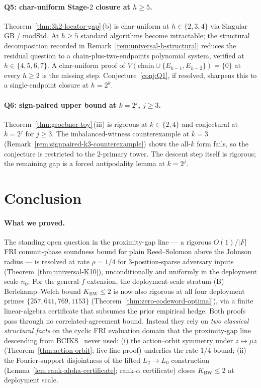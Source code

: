 \documentclass[11pt]{article}
\theoremstyle{definition}
\theoremstyle{remark}
\begin{document}
\paragraph{Q5: char-uniform Stage-$2$ closure at $h \geq 5$.}
Theorem~\ref{thm:3k2-locator-gap}\,(b) is char-uniform at
$h \in \{2, 3, 4\}$ via Singular GB / modStd. At $h \geq 5$ standard
algorithms become intractable; the structural decomposition recorded
in Remark~\ref{rem:universal-h-structural} reduces the residual
question to a chain-plus-two-endpoints polynomial system, verified at
$h \in \{4, 5, 6, 7\}$. A char-uniform proof of $V(\text{chain} \cup
\{E_{h-1}, E_{h-2}\}) = \{0\}$ at every $h \geq 2$ is the missing
step. Conjecture~\ref{conj:Q1}, if resolved, sharpens this to a
single-endpoint closure at $h = 2^k$.

\paragraph{Q6: sign-paired upper bound at $k = 2^j$, $j \geq 3$.}
Theorem~\ref{thm:groebner-toy}\,(iii) is rigorous at
$k \in \{2, 4\}$ and conjectural at $k = 2^j$ for $j \geq 3$. The
imbalanced-witness counterexample at $k = 3$
(Remark~\ref{rem:signpaired-k3-counterexample}) shows the all-$k$
form fails, so the conjecture is restricted to the $2$-primary tower.
The descent step itself is rigorous; the remaining gap is a forced
antipodality lemma at $k = 2^j$.

\section{Conclusion}
\label{sec:conclusion}

\paragraph{What we proved.}
The standing open question in the proximity-gap line --- a rigorous
$O(1)/|F|$ FRI commit-phase soundness bound for plain Reed--Solomon
above the Johnson radius --- is resolved at rate $\rho = 1/4$ for
$3$-position-sparse adversary inputs (Theorem~\ref{thm:universal-K10}),
unconditionally and uniformly in the deployment scale $n_0$. For the
general-$f$ extension, the deployment-scale stratum-(B) Berlekamp--Welch
bound $K_{\mathrm{BW}} \leq 2$ is now also rigorous at all four
deployment primes $\{257, 641, 769, 1153\}$
(Theorem~\ref{thm:zero-codeword-optimal}), via a finite linear-algebra
certificate that subsumes the prior empirical hedge. Both proofs pass
through no correlated-agreement bound. Instead they rely on \emph{two
classical structural facts} on the cyclic FRI evaluation domain that
the proximity-gap line descending from BCIKS~\cite{BCIKS} never used:
(i) the action--orbit symmetry under $z \mapsto \mu z$
(Theorem~\ref{thm:action-orbit}; five-line proof) underlies the rate-$1/4$
bound; (ii) the Fourier-support disjointness of the lifted
$L_2 \to L_0$ construction
(Lemma~\ref{lem:rank-alpha-certificate}; rank-$\alpha$ certificate) closes
$K_{\mathrm{BW}} \leq 2$ at deployment scale.
\end{document}
